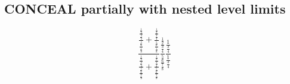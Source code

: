 \documentclass[14pt]{article}
\begin{document}
\subsection{CONCEAL partially with nested level limits}
\[
\frac{\frac{\frac{\frac{1}{2}}{\frac{3}{4}}}{\frac{\frac{5}{6}}{\frac{7}{8}}} + \frac{\frac{\frac{1}{2}}{\frac{3}{4}}}{\frac{\frac{5}{6}}{\frac{7}{8}}}}{\frac{\frac{\frac{1}{2}}{\frac{3}{4}}}{\frac{\frac{5}{6}}{\frac{7}{8}}} + \frac{\frac{\frac{1}{2}}{\frac{3}{4}}}{\frac{\frac{5}{6}}{\frac{7}{8}}}}

\frac{\frac{\frac{1}{2}}{\frac{3}{4}}}{\frac{\frac{5}{6}}{\frac{7}{8}}}
\frac{\frac{1}{\frac{3}{4}}}{\frac{1}{\frac{3}{4}}}
\]
\end{document}
